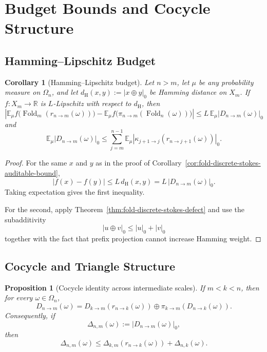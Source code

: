 \documentclass[11pt,letterpaper]{article}
\numberwithin{equation}{section}
\theoremstyle{plain}
\newtheorem{proposition}[theorem]{Proposition}
\newtheorem{corollary}[theorem]{Corollary}
\theoremstyle{definition}
\theoremstyle{remark}
\newcommand{\RR}{\mathbb{R}}
\newcommand{\EE}{\mathbb{E}}
\DeclareMathOperator{\Fold}{Fold}
\begin{document}
\section{Budget Bounds and Cocycle Structure}

\subsection{Hamming--Lipschitz Budget}

\begin{corollary}[Hamming--Lipschitz budget]
\label{cor:fold-hamming-lipschitz-budget}
Let $n>m$, let $\mu$ be any probability measure on $\Omega_n$, and let
$d_{\mathrm H}(x,y):=\lvert x\oplus y\rvert_0$ be Hamming distance on $X_m$.
If $f:X_m\to\RR$ is $L$-Lipschitz with respect to $d_{\mathrm H}$, then
\[
\left|
\EE_\mu f\bigl(\Fold_m(r_{n\to m}(\omega))\bigr)
-
\EE_\mu f\bigl(\pi_{n\to m}(\Fold_n(\omega))\bigr)
\right|
\le
L\,\EE_\mu \lvert D_{n\to m}(\omega)\rvert_0
\]
and
\[
\EE_\mu \lvert D_{n\to m}(\omega)\rvert_0
\le
\sum_{j=m}^{n-1}
\EE_\mu\left\lvert
\kappa_{j+1\to j}(r_{n\to j+1}(\omega))
\right\rvert_0.
\]
\end{corollary}

\begin{proof}
For the same $x$ and $y$ as in the proof of
Corollary~\ref{cor:fold-discrete-stokes-auditable-bound},
\[
\lvert f(x)-f(y)\rvert
\le
L\,d_{\mathrm H}(x,y)
=
L\,\lvert D_{n\to m}(\omega)\rvert_0.
\]
Taking expectation gives the first inequality.

For the second, apply Theorem~\ref{thm:fold-discrete-stokes-defect} and use the
subadditivity
\[
\lvert u\oplus v\rvert_0\le \lvert u\rvert_0+\lvert v\rvert_0
\]
together with the fact that prefix projection cannot increase Hamming weight.
\end{proof}

\subsection{Cocycle and Triangle Structure}

\begin{proposition}[Cocycle identity across intermediate scales]
\label{prop:fold-defect-cocycle}
If $m<k<n$, then for every $\omega\in\Omega_n$,
\[
D_{n\to m}(\omega)
=
D_{k\to m}(r_{n\to k}(\omega))
\oplus
\pi_{k\to m}(D_{n\to k}(\omega)).
\]
Consequently, if
\[
\Delta_{n,m}(\omega):=\lvert D_{n\to m}(\omega)\rvert_0,
\]
then
\[
\Delta_{n,m}(\omega)
\le
\Delta_{k,m}(r_{n\to k}(\omega))
+
\Delta_{n,k}(\omega).
\]
\end{proposition}
\end{document}
